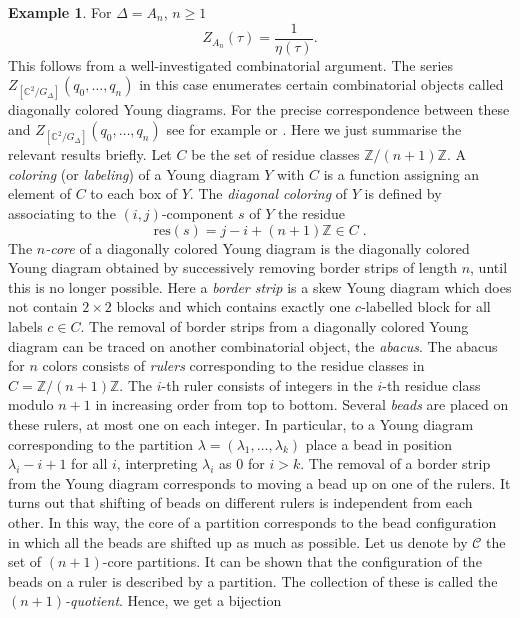 \documentclass[11pt,a4paper]{amsart}
\theoremstyle{definition}
\newtheorem{example}[theorem]{Example}
\newcommand{\SZ}{\mathbb{Z}}                    %
\newcommand{\SC}{\mathbb{C}}                    %
\begin{document}
\begin{example} 
\label{ex:anlocaleta}	
For $\Delta=A_n$, $n \geq 1$
\[ Z_{A_n}(\tau)= \frac{1}{\eta(\tau)}.  \]
This follows from a well-investigated combinatorial argument. The series $Z_{[\SC^2/G_\Delta]}(q_0,\dots,q_n)$ in this case enumerates certain combinatorial objects called diagonally colored Young diagrams. For the precise correspondence between these and $Z_{[\SC^2/G_\Delta]}(q_0,\dots,q_n)$ see for example \cite{fujii2017combinatorial} or \cite{gyenge2017enumeration}. Here we just summarise the relevant results briefly. Let $C$ be the set of residue classes $\SZ/(n+1)\SZ$. A \emph{coloring} (or \emph{labeling}) of a Young diagram $Y$ with $C$ is a function assigning an element of $C$ to each box of $Y$. The \emph{diagonal coloring} of $Y$ is defined by associating to the $(i,j)$-component $s$ of $Y$ the residue
\[ \mathrm{res}(s)=j-i+(n+1)\SZ \in C\;.\]
The \emph{$n$-core} of a diagonally colored Young diagram is the diagonally colored Young diagram obtained by successively removing border strips of length $n$, until this is no longer possible. Here a {\em border strip} is a skew Young diagram which does not contain $2 \times 2$ blocks and 
which contains exactly one $c$-labelled block for all labels $c \in C$. The removal of border strips from a diagonally colored Young diagram can be traced on another combinatorial object, the \emph{abacus}. The abacus for $n$ colors consists of \emph{rulers} corresponding to the residue classes in $C=\SZ/(n+1)\SZ$.  The $i$-th ruler consists of integers in the $i$-th residue class modulo $n+1$ in increasing order from top to bottom. Several \emph{beads} are placed on these rulers, at most one on each integer. %
In particular, to a Young diagram corresponding to the partition $\lambda=(\lambda_1,\dots,\lambda_k)$ place a bead in position $\lambda_i-i+1$ for all $i$, interpreting $\lambda_i$ as 0 for $i>k$. 
The removal of a border strip from the Young diagram corresponds to moving a bead up on one of the rulers. It turns out that shifting of beads on different rulers is independent from each other. In this way, the core of a partition corresponds to the bead configuration in which all the beads are shifted up as much as possible. Let us denote by $\mathcal{C}$ the set of $(n+1)$-core partitions. %
It can be shown that the configuration of the beads on a ruler is described by a partition. The collection of these is called the \emph{$(n+1)$-quotient}. Hence, we get a bijection

\end{example}
\end{document}
